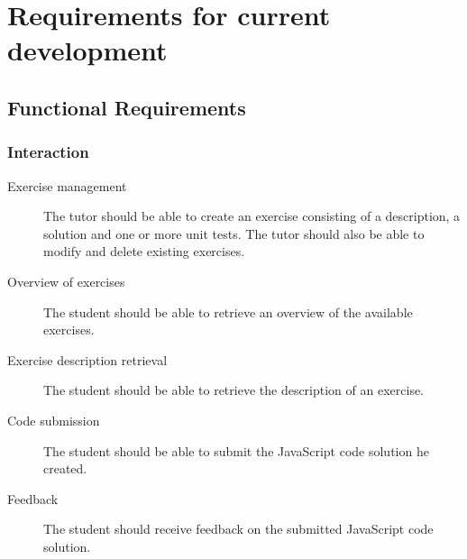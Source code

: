 
\section{Requirements for current development}
\subsection{Functional Requirements}
\subsubsection{Interaction}
\begin{description}
  \item[Exercise management] The tutor should be able to create an exercise
    consisting of a description, a solution and one or more unit tests. The
    tutor should also be able to modify and delete existing exercises.
  \item[Overview of exercises] The student should be able to retrieve an
    overview of the available exercises.
  \item[Exercise description retrieval] The student should be able to retrieve
    the description of an exercise.
  \item[Code submission] The student should be able to submit the JavaScript
    code solution he created.
  \item[Feedback] The student should receive feedback on the submitted
    JavaScript code solution.
\end{description}

